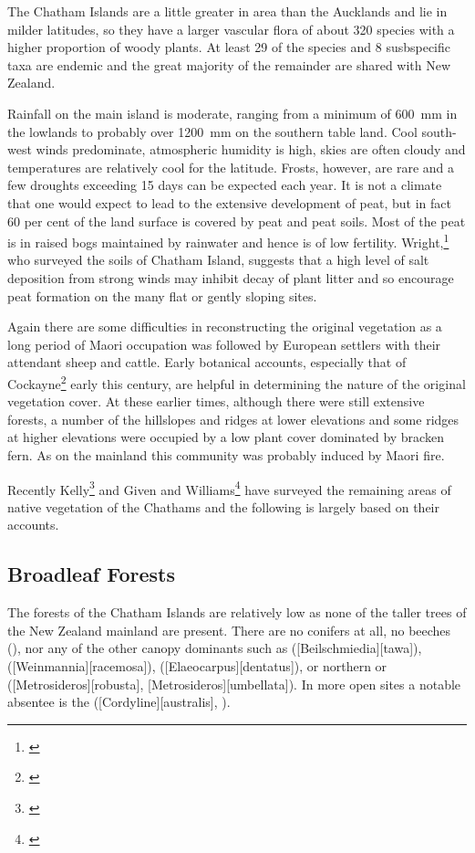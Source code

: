 The Chatham Islands are a little greater in area than the Aucklands and lie in milder latitudes, so they have a larger vascular flora of about 320 species with a higher proportion of woody plants.
At least 29 of the species and 8 susbspecific taxa are endemic and the great majority of the remainder are shared with New Zealand.

Rainfall on the main island is moderate, ranging from a minimum of \SI{600}{\milli\metre} in the lowlands to probably over \SI{1200}{\milli\metre} on the southern table land.
Cool south-west winds predominate, atmospheric humidity is high, skies are often cloudy and temperatures are relatively cool for the latitude.
Frosts, however, are rare and a few droughts exceeding 15 days can be expected each year.
It is not a climate that one would expect to lead to the extensive development of peat, but in fact 60 per cent of the land surface is covered by peat and peat soils.
Most of the peat is in raised bogs maintained by rainwater and hence is of low fertility.
Wright,\footnote{\cite{wright1959soils}} who surveyed the soils of Chatham Island, suggests that a high level of salt deposition from strong winds may inhibit decay of plant litter and so encourage peat formation on the many flat or gently sloping sites.

Again there are some difficulties in reconstructing the original vegetation as a long period of Maori occupation was followed by European settlers with their attendant sheep and cattle.
Early botanical accounts, especially that of Cockayne\footnote{\cite{cockayne1902chatham}} early this century, are helpful in determining the nature of the original vegetation cover.
At these earlier times, although there were still extensive forests, a number of the hillslopes and ridges at lower elevations and some ridges at higher elevations were occupied by a low plant cover dominated by bracken fern.
As on the mainland this community was probably induced by Maori fire.

Recently Kelly\footnote{\cite{kelly1983distribution}} and Given and Williams\footnote{\cite{given1984conservation}} have surveyed the remaining areas of native vegetation of the Chathams and the following is largely based on their accounts.

\subsection{Broadleaf Forests}

The forests of the Chatham Islands are relatively low as none of the taller trees of the New Zealand mainland are present.
There are no conifers at all, no beeches (), nor any of the other canopy dominants such as  ([Beilschmiedia][tawa]),  ([Weinmannia][racemosa]),  ([Elaeocarpus][dentatus]), or northern or  ([Metrosideros][robusta], [Metrosideros][umbellata]).
In more open sites a notable absentee is the  ([Cordyline][australis], ).

